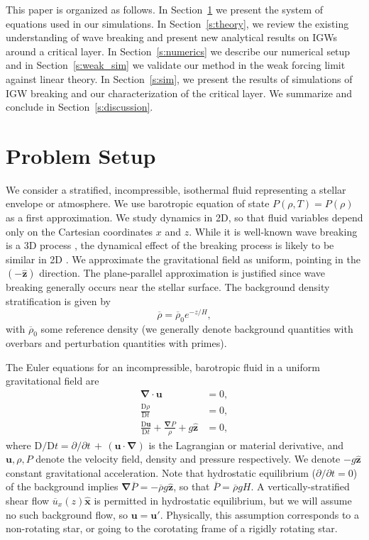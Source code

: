 \documentclass[
        fleqn,
        usenatbib,
        referee,
    ]{mnras}
\newcommand*{\mdil}[2]{\mathrm{D}#1/\mathrm{D}#2}
\newcommand*{\pdil}[2]{\partial#1/\partial#2}
\newcommand*{\md}[2]{\frac{\mathrm{D}#1}{\mathrm{D}#2}}
\newcommand*{\p}[1]{\left(#1\right)}
\newcommand*{\bm}[1]{\mathbf{#1}}
\newcommand*{\uv}[1]{\hat{\mathbf{#1}}}
\begin{document}
This paper is organized as follows. In Section~\ref{s:equations} we present the
system of equations used in our simulations. In Section~\ref{s:theory}, we
review the existing understanding of wave breaking and present new analytical
results on IGWs around a critical layer. In Section~\ref{s:numerics} we describe
our numerical setup and in Section~\ref{s:weak_sim} we validate our method in
the weak forcing limit against linear theory. In Section~\ref{s:sim}, we present
the results of simulations of IGW breaking and our characterization of the
critical layer. We summarize and conclude in Section~\ref{s:discussion}.

\section{Problem Setup}\label{s:equations}

We consider a stratified, incompressible, isothermal fluid representing a
stellar envelope or atmosphere. We use barotropic equation of state $P(\rho, T)
= P(\rho)$ as a first approximation. We study dynamics in 2D, so that fluid
variables depend only on the Cartesian coordinates $x$ and $z$. While it is
well-known wave breaking is a 3D process \citep{klostermeyer,winters1994}, the
dynamical effect of the breaking process is likely to be similar in 2D
\citep{barker_ogilvie}. We approximate the gravitational field as uniform,
pointing in the $(-\uv{z})$ direction. The plane-parallel approximation is
justified since wave breaking generally occurs near the stellar surface. The
background density stratification is given by
\begin{equation}
    \overline{\rho} = \overline{\rho}_0 e^{-z/H},
\end{equation}
with $\overline{\rho}_0$ some reference density (we generally denote background
quantities with overbars and perturbation quantities with primes).

The Euler equations for an incompressible, barotropic fluid in a uniform
gravitational field are
\begin{subequations}\label{se:nl_orig}
    \begin{align}
        \bm{\nabla} \cdot \bm{u} &= 0,\label{eq:nl_incomp}\\
        \md{\rho}{t} &= 0 ,\label{eq:nl_density}\\
        \md{\bm{u}}{t} + \frac{\bm{\nabla}P}{\rho} + g\uv{z} &=
            0\label{eq:nl_mom},
    \end{align}
\end{subequations}
where $\mdil{}{t} = \pdil{}{t}\,+\,\p{\bm{u} \cdot \bm{\nabla}}$ is the
Lagrangian or material derivative, and $\bm{u}, \rho, P$ denote the velocity
field, density and pressure respectively. We denote $-g\uv{z}$ constant
gravitational acceleration. Note that hydrostatic equilibrium ($\pdil{}{t} = 0$)
of the background implies $\bm{\nabla}\overline{P} = -\overline{\rho} g\uv{z}$,
so that $\overline{P} = \overline{\rho} gH$. A vertically-stratified shear flow
$\overline{u}_x(z)\uv{x}$ is permitted in hydrostatic equilibrium, but we will
assume no such background flow, so $\bm{u} = \bm{u}'$. Physically, this
assumption corresponds to a non-rotating star, or going to the corotating frame
of a rigidly rotating star.
\end{document}
